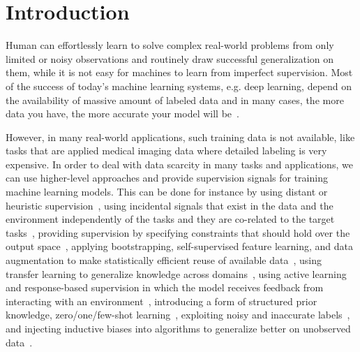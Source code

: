 \chapter{Introduction}
Human can effortlessly learn to solve complex real-world problems from only limited or noisy observations and routinely draw successful generalization on them, while it is not easy for machines to learn from imperfect supervision.
Most of the success of today's machine learning systems, e.g. deep learning,  depend on the availability of massive amount of labeled data and in many cases, the more data you have, the more accurate your model will be~\citep{halevy2009unreasonable,sun2017revisiting}. 

However, in many real-world applications, such training data is not available, like tasks that are applied medical imaging data where detailed labeling is very expensive. In order to deal with data scarcity in many tasks and applications, we can use higher-level approaches and provide supervision signals for training machine learning models. This can be done for instance by
using distant or heuristic supervision~\citep{Deriu2016:SemEval,Severyn:2015:SemEval, Dehghani:2016:SIGIR, dehghani:2018:ICLR, Dehghani:2017:nips_metalearn, Ratner:2016,Rekatsinas:2017,Varma:2017}, 
%
using incidental signals that exist in the data and the environment independently of the tasks and they are co-related to the target tasks~\citep{roth2017incidental}, 
%
providing supervision by specifying constraints that should hold over the output space~\citep{stewart2017label, clarke2010driving}, 
%
applying bootstrapping, self-supervised feature learning, and data augmentation to make statistically efficient reuse of available data~\citep{cubuk2018autoaugment, dosovitskiy2016discriminative,donahue2016adversarial},
%
using transfer learning to generalize knowledge across domains~\citep{Ruder:2019},
%
using active learning and response-based supervision in which the model receives feedback from interacting with an environment~\citep{clarke2010driving,riezler2014response},
%
introducing a form of structured prior knowledge\citep{Dehghani:CIKM2016:long,Dehghani:2016:ICTIR}, 
%
zero/one/few-shot learning~\citep{vinyals2016matching,finn2017model,snell2017prototypical,socher2013zero},
%
exploiting noisy and inaccurate labels~\citep{Vahdat:2017, Lee:2013,Hinton:2015,Brodley:1999,reed2014training, Patrini:2016, patrini2016loss,malach2017decoupling}, 
%
and injecting inductive biases into algorithms to generalize better on unobserved data~\citep{cohen2016group, cohen2016steerable, Dehghani:ICLR:2019}.

